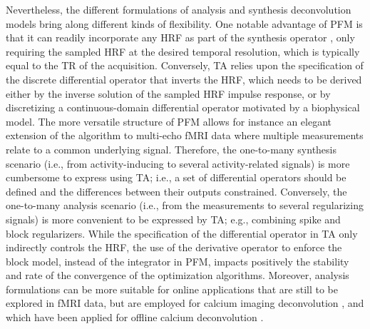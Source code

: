 Nevertheless, the different formulations of analysis and synthesis deconvolution
models bring along different kinds of flexibility. One notable advantage of PFM
is that it can readily incorporate any HRF as part of the synthesis operator
\citep{Elad2007Analysisversussynthesis}, only requiring the sampled HRF at the
desired temporal resolution, which is typically equal to the TR of the
acquisition. Conversely, TA relies upon the specification of the discrete
differential operator that inverts the HRF, which needs to be derived either by
the inverse solution of the sampled HRF impulse response, or by discretizing a
continuous-domain differential operator motivated by a biophysical model. The
more versatile structure of PFM allows for instance an elegant extension of the
algorithm to multi-echo fMRI data
\citep{CaballeroGaudes2019deconvolutionalgorithmmulti} where multiple
measurements relate to a common underlying signal. Therefore, the one-to-many
synthesis scenario (i.e., from activity-inducing to several activity-related
signals) is more cumbersome to express using TA; i.e., a set of differential
operators should be defined and the differences between their outputs
constrained. Conversely, the one-to-many analysis scenario (i.e., from the
measurements to several regularizing signals) is more convenient to be expressed
by TA; e.g., combining spike and block regularizers. While the specification of
the differential operator in TA only indirectly controls the HRF, the use of the
derivative operator to enforce the block model, instead of the integrator in
PFM, impacts positively the stability and rate of the convergence of the
optimization algorithms. Moreover, analysis formulations can be more suitable
for online applications that are still to be explored in fMRI data, but are
employed for calcium imaging deconvolution \citep{Friedrich_2017,Jewell_2019},
and which have been applied for offline calcium deconvolution
\citep{Farouj2020DeconvolutionSustainedNeural}.

